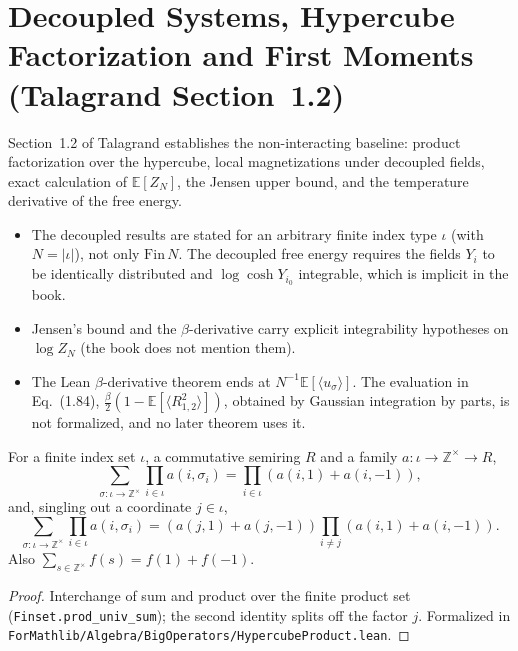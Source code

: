 \section{Decoupled Systems, Hypercube Factorization and First Moments (Talagrand Section~1.2)}\label{sec:sg-tal:decoupled}

Section~1.2 of Talagrand establishes the non-interacting baseline: product factorization over the hypercube, local magnetizations under decoupled fields, exact calculation of $\mathbb{E}[Z_N]$, the Jensen upper bound, and the temperature derivative of the free energy.

\begin{remark}\label{rem:sg-tal:dev-12}
\begin{itemize}
\item The decoupled results are stated for an arbitrary finite index type $\iota$ (with $N=|\iota|$), not only $\mathrm{Fin}\,N$. The decoupled free energy requires the fields $Y_i$ to be identically distributed and $\log\cosh Y_{i_0}$ integrable, which is implicit in the book.
\item Jensen's bound and the $\beta$-derivative carry explicit integrability hypotheses on $\log Z_N$ (the book does not mention them).
\item The Lean $\beta$-derivative theorem ends at $N^{-1}\mathbb{E}[\langle u_\sigma\rangle]$. The evaluation in Eq.~(1.84), $\frac{\beta}{2}(1-\mathbb{E}[\langle R_{1,2}^2\rangle])$, obtained by Gaussian integration by parts, is not formalized, and no later theorem uses it.
\end{itemize}
\end{remark}

\begin{lemma}\label{lem:sg-tal:hypercube-prod}
  \leanok
{}
For a finite index set $\iota$, a commutative semiring $R$ and a family $a : \iota \to \mathbb{Z}^\times \to R$,
\[
\sum_{\sigma : \iota \to \mathbb{Z}^\times} \prod_{i \in \iota} a(i, \sigma_i) = \prod_{i \in \iota} (a(i, 1) + a(i, -1)),
\]
and, singling out a coordinate $j \in \iota$,
\[
\sum_{\sigma : \iota \to \mathbb{Z}^\times} \prod_{i \in \iota} a(i, \sigma_i) = (a(j, 1) + a(j, -1)) \prod_{i \neq j} (a(i, 1) + a(i, -1)).
\]
Also $\sum_{s\in\mathbb Z^\times}f(s)=f(1)+f(-1)$.
\end{lemma}
\begin{proof}
  \leanok
Interchange of sum and product over the finite product set (\texttt{Finset.prod\_univ\_sum}); the second identity splits off the factor $j$.
Formalized in \texttt{ForMathlib/Algebra/BigOperators/HypercubeProduct.lean}.
\end{proof}


